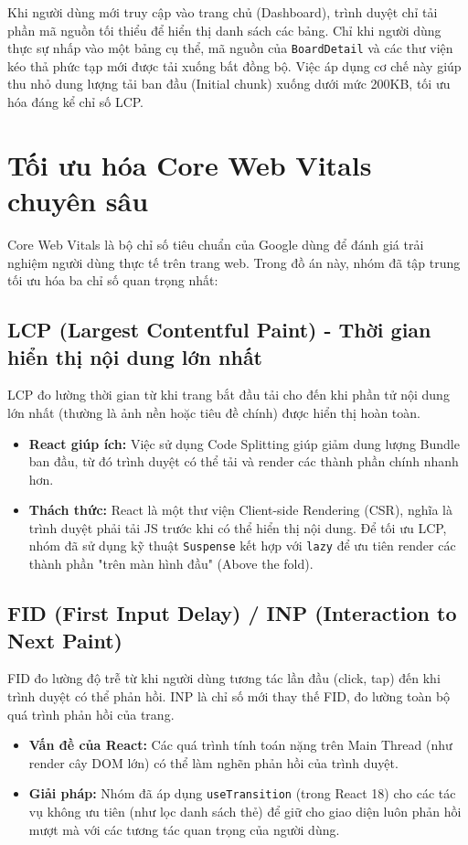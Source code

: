 Khi người dùng mới truy cập vào trang chủ (Dashboard), trình duyệt chỉ tải phần mã nguồn tối thiểu để hiển thị danh sách các bảng. Chỉ khi người dùng thực sự nhấp vào một bảng cụ thể, mã nguồn của \texttt{BoardDetail} và các thư viện kéo thả phức tạp mới được tải xuống bất đồng bộ. Việc áp dụng cơ chế này giúp thu nhỏ dung lượng tải ban đầu (Initial chunk) xuống dưới mức 200KB, tối ưu hóa đáng kể chỉ số LCP.

\section{Tối ưu hóa Core Web Vitals chuyên sâu}
Core Web Vitals là bộ chỉ số tiêu chuẩn của Google dùng để đánh giá trải nghiệm người dùng thực tế trên trang web. Trong đồ án này, nhóm đã tập trung tối ưu hóa ba chỉ số quan trọng nhất:

\subsection{LCP (Largest Contentful Paint) - Thời gian hiển thị nội dung lớn nhất}
LCP đo lường thời gian từ khi trang bắt đầu tải cho đến khi phần tử nội dung lớn nhất (thường là ảnh nền hoặc tiêu đề chính) được hiển thị hoàn toàn.
\begin{itemize}
    \item \textbf{React giúp ích:} Việc sử dụng Code Splitting giúp giảm dung lượng Bundle ban đầu, từ đó trình duyệt có thể tải và render các thành phần chính nhanh hơn.
    \item \textbf{Thách thức:} React là một thư viện Client-side Rendering (CSR), nghĩa là trình duyệt phải tải JS trước khi có thể hiển thị nội dung. Để tối ưu LCP, nhóm đã sử dụng kỹ thuật \texttt{Suspense} kết hợp với \texttt{lazy} để ưu tiên render các thành phần "trên màn hình đầu" (Above the fold).
\end{itemize}

\subsection{FID (First Input Delay) / INP (Interaction to Next Paint)}
FID đo lường độ trễ từ khi người dùng tương tác lần đầu (click, tap) đến khi trình duyệt có thể phản hồi. INP là chỉ số mới thay thế FID, đo lường toàn bộ quá trình phản hồi của trang.
\begin{itemize}
    \item \textbf{Vấn đề của React:} Các quá trình tính toán nặng trên Main Thread (như render cây DOM lớn) có thể làm nghẽn phản hồi của trình duyệt.
    \item \textbf{Giải pháp:} Nhóm đã áp dụng \texttt{useTransition} (trong React 18) cho các tác vụ không ưu tiên (như lọc danh sách thẻ) để giữ cho giao diện luôn phản hồi mượt mà với các tương tác quan trọng của người dùng.
\end{itemize}

